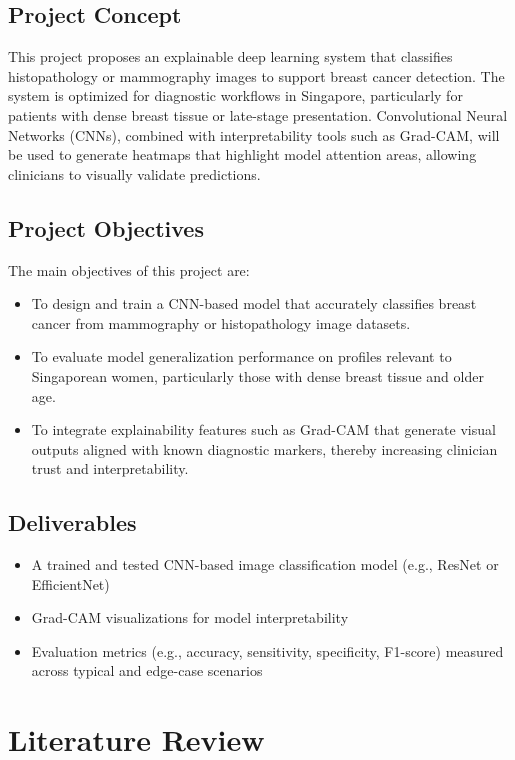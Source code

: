 \documentclass[12pt]{article}
\begin{document}
\subsection{Project Concept}
This project proposes an explainable deep learning system that classifies histopathology or mammography images to support breast cancer detection. The system is optimized for diagnostic workflows in Singapore, particularly for patients with dense breast tissue or late-stage presentation. Convolutional Neural Networks (CNNs), combined with interpretability tools such as Grad-CAM, will be used to generate heatmaps that highlight model attention areas, allowing clinicians to visually validate predictions.

\subsection{Project Objectives}
The main objectives of this project are:
\begin{itemize}
    \item To design and train a CNN-based model that accurately classifies breast cancer from mammography or histopathology image datasets.
    \item To evaluate model generalization performance on profiles relevant to Singaporean women, particularly those with dense breast tissue and older age.
    \item To integrate explainability features such as Grad-CAM that generate visual outputs aligned with known diagnostic markers, thereby increasing clinician trust and interpretability.
\end{itemize}

\subsection{Deliverables}
\begin{itemize}
    \item A trained and tested CNN-based image classification model (e.g., ResNet or EfficientNet)
    \item Grad-CAM visualizations for model interpretability
    \item Evaluation metrics (e.g., accuracy, sensitivity, specificity, F1-score) measured across typical and edge-case scenarios
\end{itemize}


\newpage

\newpage
\section{Literature Review}
\end{document}
